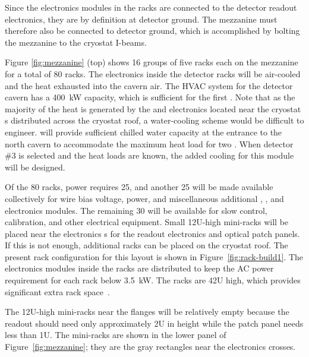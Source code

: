 Since the electronics modules in the  racks are connected to the detector readout electronics, they are by definition at detector ground. The mezzanine must therefore also be connected to detector ground, which is accomplished by bolting the mezzanine to the cryostat I-beams. 


 
Figure \ref{fig:mezzanine} (top) shows 16 groups of five racks each
on the mezzanine for a total of 80 racks. 
The electronics inside the detector racks will be air-cooled and the heat exhausted into the cavern air. The HVAC system for the detector cavern has a \SI{400}{kW} capacity, which is sufficient for the first .  Note that as the majority of the heat is generated by the  and  electronics located near the cryostat \fdth{}s distributed across the cryostat roof, a water-cooling scheme would be difficult to engineer.
  will provide sufficient chilled water capacity at the entrance to the north cavern to accommodate the maximum heat load for two . When detector \#3 is selected and the heat loads are known, the added cooling for this module will be designed.



Of the 80 racks,   power requires \num{25}, and another \num{25} will be made available collectively for   wire bias voltage,  power, and miscellaneous additional , , and   electronics modules. 
The remaining 30 will be available for slow control, calibration, and other electrical equipment. 
Small 12U-high mini-racks will  be placed near the electronics \fdth{}s for the  readout electronics and optical patch panels. If this is not enough, additional racks can be placed on the cryostat roof. The present rack configuration for this layout is shown in Figure~\ref{fig:rack-build1}. 
The electronics modules inside the racks are distributed to keep the AC power requirement for each rack below \SI{3.5}{kW}. 
The racks are 42U high, which provides significant extra rack space~\cite{bib:docdb4499}.  


The 12U-high mini-racks near the \fdth flanges will be relatively empty because the  readout should need only approximately 2U in height while the  patch panel needs less than 1U. The mini-racks are shown in the lower panel of Figure~\ref{fig:mezzanine}; 
they are the gray rectangles near the electronics crosses.

